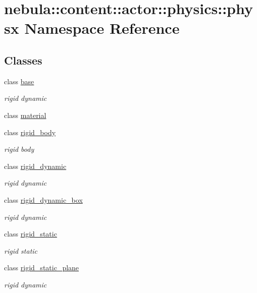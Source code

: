 \hypertarget{namespacenebula_1_1content_1_1actor_1_1physics_1_1physx}{
\section{nebula::content::actor::physics::physx Namespace Reference}
\label{namespacenebula_1_1content_1_1actor_1_1physics_1_1physx}
}
\subsection*{Classes}
\begin{DoxyCompactItemize}
\item 
class \hyperlink{classnebula_1_1content_1_1actor_1_1physics_1_1physx_1_1base}{base}
\begin{DoxyCompactList}\small\item\em rigid dynamic \item\end{DoxyCompactList}\item 
class \hyperlink{classnebula_1_1content_1_1actor_1_1physics_1_1physx_1_1material}{material}
\item 
class \hyperlink{classnebula_1_1content_1_1actor_1_1physics_1_1physx_1_1rigid__body}{rigid\_\-body}
\begin{DoxyCompactList}\small\item\em rigid body \item\end{DoxyCompactList}\item 
class \hyperlink{classnebula_1_1content_1_1actor_1_1physics_1_1physx_1_1rigid__dynamic}{rigid\_\-dynamic}
\begin{DoxyCompactList}\small\item\em rigid dynamic \item\end{DoxyCompactList}\item 
class \hyperlink{classnebula_1_1content_1_1actor_1_1physics_1_1physx_1_1rigid__dynamic__box}{rigid\_\-dynamic\_\-box}
\begin{DoxyCompactList}\small\item\em rigid dynamic \item\end{DoxyCompactList}\item 
class \hyperlink{classnebula_1_1content_1_1actor_1_1physics_1_1physx_1_1rigid__static}{rigid\_\-static}
\begin{DoxyCompactList}\small\item\em rigid static \item\end{DoxyCompactList}\item 
class \hyperlink{classnebula_1_1content_1_1actor_1_1physics_1_1physx_1_1rigid__static__plane}{rigid\_\-static\_\-plane}
\begin{DoxyCompactList}\small\item\em rigid dynamic \item\end{DoxyCompactList}\end{DoxyCompactItemize}
